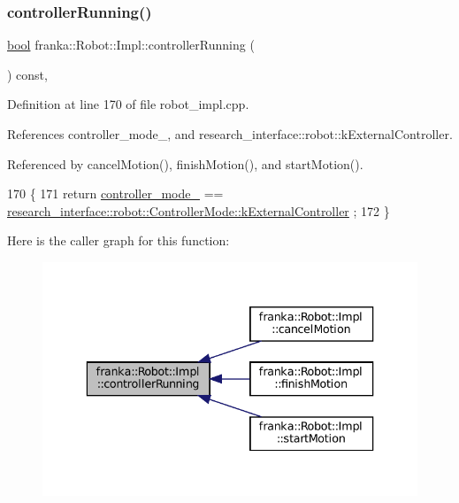 \subsubsection{\texorpdfstring{controller\+Running()}{controllerRunning()}}
{\footnotesize\ttfamily \hyperlink{classbool}{bool} franka\+::\+Robot\+::\+Impl\+::controller\+Running (\begin{DoxyParamCaption}{ }\end{DoxyParamCaption}) const\hspace{0.3cm}{\ttfamily [protected]}, {\ttfamily [noexcept]}}



Definition at line 170 of file robot\+\_\+impl.\+cpp.



References controller\+\_\+mode\+\_\+, and research\+\_\+interface\+::robot\+::k\+External\+Controller.



Referenced by cancel\+Motion(), finish\+Motion(), and start\+Motion().


\begin{DoxyCode}
170                                                  \{
171   \textcolor{keywordflow}{return} \hyperlink{classfranka_1_1Robot_1_1Impl_aa435885c35275fc60b8de90832ae24df}{controller\_mode\_} == 
      \hyperlink{namespaceresearch__interface_1_1robot_a54ee0c8bfefd2ee8a46837ca6d2b1213aae18ec698c6d2260b411166de51e86fe}{research\_interface::robot::ControllerMode::kExternalController}
      ;
172 \}
\end{DoxyCode}
Here is the caller graph for this function\+:
\nopagebreak
\begin{figure}[H]
\begin{center}
\leavevmode
\includegraphics[width=336pt]{classfranka_1_1Robot_1_1Impl_ac2d91fb2b9838536bcea8ab1aae4802e_icgraph}
\end{center}
\end{figure}
\mbox{\label{classfranka_1_1Robot_1_1Impl_a6e018e65fddf90613219c2935327f80f}} 
